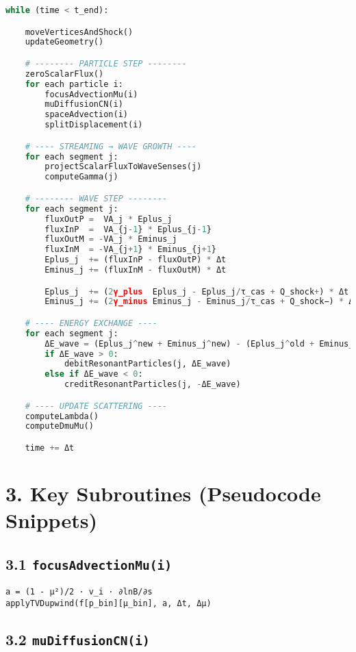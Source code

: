 \begin{lstlisting}[language=Python]
while (time < t_end):

    moveVerticesAndShock()
    updateGeometry()

    # -------- PARTICLE STEP --------
    zeroScalarFlux()
    for each particle i:
        focusAdvectionMu(i)
        muDiffusionCN(i)
        spaceAdvection(i)
        splitDisplacement(i)

    # ---- STREAMING → WAVE GROWTH ----
    for each segment j:
        projectScalarFluxToWaveSenses(j)
        computeGamma(j)

    # -------- WAVE STEP --------
    for each segment j:
        fluxOutP =  VA_j * Eplus_j
        fluxInP  =  VA_{j-1} * Eplus_{j-1}
        fluxOutM = -VA_j * Eminus_j
        fluxInM  = -VA_{j+1} * Eminus_{j+1}
        Eplus_j  += (fluxInP - fluxOutP) * Δt
        Eminus_j += (fluxInM - fluxOutM) * Δt

        Eplus_j  += (2γ_plus  Eplus_j - Eplus_j/τ_cas + Q_shock+) * Δt
        Eminus_j += (2γ_minus Eminus_j - Eminus_j/τ_cas + Q_shock−) * Δt

    # ---- ENERGY EXCHANGE ----
    for each segment j:
        ΔE_wave = (Eplus_j^new + Eminus_j^new) - (Eplus_j^old + Eminus_j^old)
        if ΔE_wave > 0:
            debitResonantParticles(j, ΔE_wave)
        else if ΔE_wave < 0:
            creditResonantParticles(j, -ΔE_wave)

    # ---- UPDATE SCATTERING ----
    computeLambda()
    computeDmuMu()

    time += Δt
\end{lstlisting}

\section*{3. Key Subroutines (Pseudocode Snippets)}

\subsection*{3.1 \texttt{focusAdvectionMu(i)}}

\begin{lstlisting}
a = (1 - μ²)/2 · v_i · ∂lnB/∂s
applyTVDupwind(f[p_bin][μ_bin], a, Δt, Δμ)
\end{lstlisting}

\subsection*{3.2 \texttt{muDiffusionCN(i)}}

